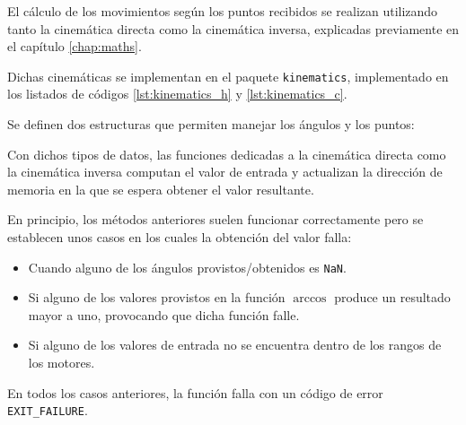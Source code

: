 El cálculo de los movimientos según los puntos recibidos se realizan utilizando
tanto la cinemática directa como la cinemática inversa, explicadas previamente
en el capítulo \ref{chap:maths}.

Dichas cinemáticas se implementan en el paquete \texttt{kinematics}, implementado
en los listados de códigos \ref{lst:kinematics_h} y \ref{lst:kinematics_c}.

Se definen dos estructuras que permiten manejar los ángulos y los puntos:



Con dichos tipos de datos, las funciones dedicadas a la cinemática directa como la
cinemática inversa computan el valor de entrada y actualizan la dirección de memoria
en la que se espera obtener el valor resultante.

En principio, los métodos anteriores suelen funcionar correctamente pero se establecen
unos casos en los cuales la obtención del valor falla:

\begin{itemize}
    \item Cuando alguno de los ángulos provistos/obtenidos es \texttt{NaN}.
    \item Si alguno de los valores provistos en la función $\arccos$ produce un
    resultado mayor a uno, provocando que dicha función falle.
    \item Si alguno de los valores de entrada no se encuentra dentro de los rangos
    de los motores.
\end{itemize}

En todos los casos anteriores, la función falla con un código de error \texttt{EXIT\_FAILURE}.